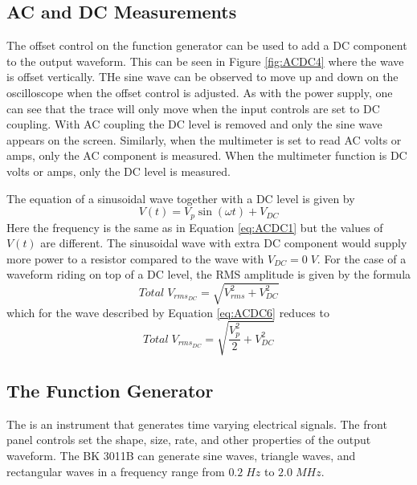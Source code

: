 \documentclass[12pt, a4paper, oneside, openright, titlepage]{book}
\begin{document}
\subsection{AC and DC Measurements}

The offset control on the function generator can be used to add a DC component to the output waveform. This can be seen in Figure \ref{fig:ACDC4} where the wave is offset vertically. THe sine wave can be observed to move up and down on the oscilloscope when the offset control is adjusted. As with the power supply, one can see that the trace will only move when the input controls are set to DC coupling. With AC coupling the DC level is removed and only the sine wave appears on the screen. Similarly, when the multimeter is set to read AC volts or amps, only the AC component is measured. When the multimeter function is DC volts or amps, only the DC level is measured.

\noindent The equation of a sinusoidal wave together with a DC level is given by \begin{equation}\label{eq:ACDC6}
    V(t) = V_p\sin(\omega t)+V_{DC}
\end{equation}
Here the frequency is the same as in Equation \ref{eq:ACDC1} but the values of $V(t)$ are different. The sinusoidal wave with extra DC component would supply more power to a resistor compared to the wave with $V_{DC} = 0 \; V$. For the case of a waveform riding on top of a DC level, the RMS amplitude is given by the formula \begin{equation}\label{eq:ACDC7}
    Total\;V_{rms_{DC}} = \sqrt{V_{rms}^2+V_{DC}^2}
\end{equation}
which for the wave described by Equation \ref{eq:ACDC6} reduces to \begin{equation}\label{eq:ACDC8}
    Total\;V_{rms_{DC}} = \sqrt{\frac{V_p^2}{2}+V_{DC}^2}
\end{equation}


\subsection{The Function Generator}

The  is an instrument that generates time varying electrical signals. The front panel controls set the shape, size, rate, and other properties of the output waveform. The BK 3011B can generate sine waves, triangle waves, and rectangular waves in a frequency range from $0.2\;Hz$ to $2.0\;MHz$.
\end{document}
